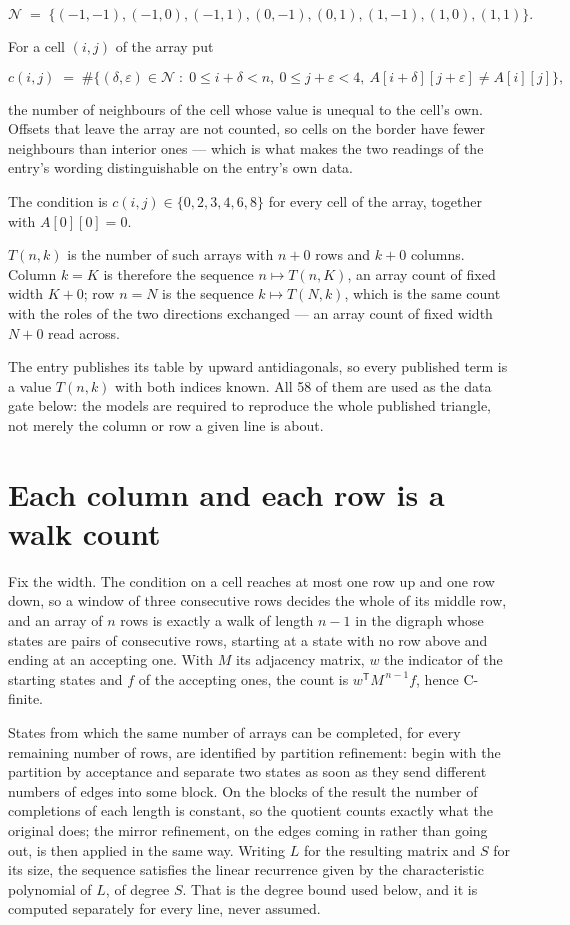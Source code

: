 \documentclass[11pt]{article}
\theoremstyle{definition}
\begin{document}
\[\mathcal{N} \;=\; \{(-1,-1), (-1,0), (-1,1), (0,-1), (0,1), (1,-1), (1,0), (1,1)\}.\]

For a cell $(i,j)$ of the array put

\[c(i,j) \;=\; \#\bigl\{(\delta,\varepsilon)\in\mathcal{N} \;:\; 0\le i+\delta<n,\ 0\le j+\varepsilon<4,\ A[i+\delta][j+\varepsilon] \neq A[i][j]\bigr\},\]

the number of neighbours of the cell whose value is unequal to the cell's own. Offsets that leave the array are not counted, so cells on the border have fewer neighbours than interior ones --- which is what makes the two readings of the entry's wording distinguishable on the entry's own data.

The condition is $c(i,j) \in \{0, 2, 3, 4, 6, 8\}$ for every cell of the array, together with $A[0][0]=0$.

$T(n,k)$ is the number of such arrays with $n + 0$ rows and $k + 0$ columns. Column $k = K$ is therefore the sequence $n \mapsto T(n,K)$, an array count of fixed width $K + 0$; row $n = N$ is the sequence $k \mapsto T(N,k)$, which is the same count with the roles of the two directions exchanged --- an array count of fixed width $N + 0$ read across.

The entry publishes its table by upward antidiagonals, so every published term is a value $T(n,k)$ with both indices known. All 58 of them are used as the data gate below: the models are required to reproduce the whole published triangle, not merely the column or row a given line is about.

\section{Each column and each row is a walk count}

Fix the width. The condition on a cell reaches at most one row up and one row down, so a window of three consecutive rows decides the whole of its middle row, and an array of $n$ rows is exactly a walk of length $n-1$ in the digraph whose states are pairs of consecutive rows, starting at a state with no row above and ending at an accepting one. With $M$ its adjacency matrix, $w$ the indicator of the starting states and $f$ of the accepting ones, the count is $w^{\mathsf T}M^{\,n-1}f$, hence C-finite.

States from which the same number of arrays can be completed, for every remaining number of rows, are identified by partition refinement: begin with the partition by acceptance and separate two states as soon as they send different numbers of edges into some block. On the blocks of the result the number of completions of each length is constant, so the quotient counts exactly what the original does; the mirror refinement, on the edges coming in rather than going out, is then applied in the same way. Writing $L$ for the resulting matrix and $S$ for its size, the sequence satisfies the linear recurrence given by the characteristic polynomial of $L$, of degree $S$. That is the degree bound used below, and it is computed separately for every line, never assumed.
\end{document}
